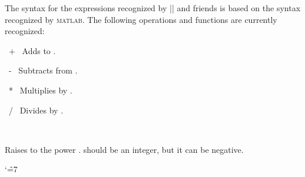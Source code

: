 \label{pgfmath-syntax}

The syntax for the expressions recognized by |\pgfmathparse| and
friends is based on the syntax recognized by \textsc{matlab}. The
following operations and functions are currently recognized:

\begin{math-operator}{\ +\ }
	Adds  to .
	
\begin{codeexample}[post=\tt\footnotesize\pgfmathresult]
\end{codeexample}
\end{math-operator}

\begin{math-operator}{\ -\ }
	Subtracts  from  .
	
\begin{codeexample}[post=\tt\footnotesize\pgfmathresult]
\end{codeexample}
\end{math-operator}
\begin{math-operator}{\ *\ }
	Multiplies  by  .
	
\begin{codeexample}[post=\tt\footnotesize\pgfmathresult]
\end{codeexample}

\end{math-operator}
\begin{math-operator}{\ /\ }
	Divides  by  .
	
\begin{codeexample}[post=\tt\footnotesize\pgfmathresult]
\end{codeexample}

\end{math-operator}
\begin{math-operator}{\ {}\ } 

Raises  to the power .  should be an integer, but it can be negative.

{
\catcode`\^=7

\begin{codeexample}[post=\tt\footnotesize\pgfmathresult]
\end{codeexample}

\begin{codeexample}[post=\tt\footnotesize\pgfmathresult]
\end{codeexample}
}
\end{math-operator}

